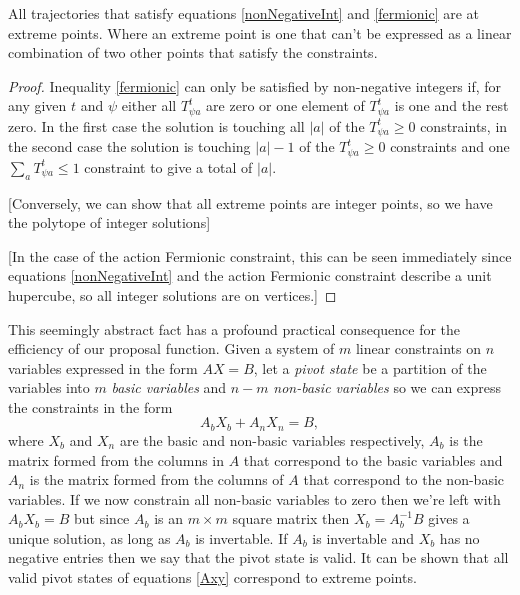 \begin{theorem}
All trajectories that satisfy equations \ref{nonNegativeInt} and \ref{fermionic} are at extreme points. Where an extreme point is one that can't be expressed as a linear combination of two other points that satisfy the constraints.
\end{theorem}
\begin{proof}

Inequality \ref{fermionic} can only be satisfied by non-negative integers if, for any given $t$ and $\psi$ either all $T^t_{\psi a}$ are zero or one element of $T^t_{\psi a}$ is one and the rest zero. In the first case the solution is touching all $|a|$ of the $T^t_{\psi a} \ge 0$ constraints, in the second case the solution is touching $|a|-1$ of the $T^t_{\psi a} \ge 0$ constraints and one $\sum_a T^t_{\psi a} \le 1$ constraint to give a total of $|a|$.

[Conversely, we can show that all extreme points are integer points, so we have the polytope of integer solutions]

[In the case of the action Fermionic constraint, this can be seen immediately since equations \ref{nonNegativeInt} and the action Fermionic constraint describe a unit hupercube, so all integer solutions are on vertices.]

\end{proof}


This seemingly abstract fact has a profound practical consequence for the efficiency of our proposal function.
Given a system of $m$ linear constraints on $n$ variables expressed in the form $AX=B$, let a \textit{pivot state} be a partition of the variables into $m$ \textit{basic variables} and $n-m$ \textit{non-basic variables} so we can express the constraints in the form
\begin{equation}
A_bX_b + A_nX_n = B,
\label{tableau1}
\end{equation}
where $X_b$ and $X_n$ are the basic and non-basic variables respectively, $A_b$ is the matrix formed from the columns in $A$ that correspond to the basic variables and $A_n$ is the matrix formed from the columns of $A$ that correspond to the non-basic variables. If we now constrain all non-basic variables to zero then we're left with $A_bX_b = B$ but since $A_b$ is an $m \times m$ square matrix then $X_b = A_b^{-1}B$ gives a unique solution, as long as $A_b$ is invertable. If $A_b$ is invertable and $X_b$ has no negative entries then we say that the pivot state is valid. It can be shown that all valid pivot states of equations \ref{Axy} correspond to extreme points\cite{dantzig1955generalized}.

